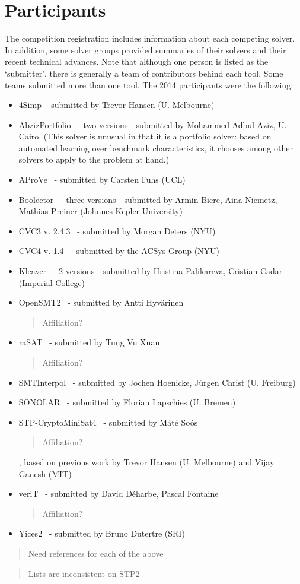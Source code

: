 \documentclass[twosize,11pt]{article}
\newcommand{\comment}[2]{\begin{quote}\sc #1\marginpar{\textcolor{red}{$\ast^{\mbox{#2}}$}}\end{quote}}
\newcommand{\davidc}[1]{\comment{#1}{DC}}
\begin{document}
\section{Participants}
\label{sec:participants}

The competition registration includes information about each competing solver. In addition, some solver groups provided summaries of their solvers and their recent technical advances.
 Note that although one person is listed as the `submitter', there is generally a team of contributors behind each tool. Some teams submitted more than one tool. The 2014 participants were the following:
\begin{itemize}
\item 4Simp~\cite{TBD}- submitted by Trevor Hansen (U. Melbourne)
\item AbzizPortfolio~\cite{TBD} - two versions - submitted by Mohammed Adbul Aziz, U. Cairo. (This solver is unusual in that it is a portfolio solver: based on automated learning over benchmark characteristics, it chooses among other solvers to apply to the problem at hand.)
\item AProVe~\cite{AProVE2014} - submitted by Carsten Fuhs (UCL)
\item Boolector~\cite{TBD} - three versions - submitted by Armin Biere, Aina Niemetz, Mathias Preiner (Johnnes Kepler University)
\item CVC3 v. 2.4.3~\cite{BT07} - submitted by Morgan Deters (NYU)
\item CVC4 v. 1.4~\cite{BCD+11} - submitted by the ACSys Group (NYU)
\item Kleaver~\cite{TBD} - 2 versions - submitted by Hristina Palikareva, Cristian Cadar (Imperial College)
\item OpenSMT2~\cite{TBD} - submitted by Antti Hyv\"arinen \davidc{Affiliation?}
\item raSAT~\cite{TBD} - submitted by Tung Vu Xuan \davidc{Affiliation?}
\item SMTInterpol~\cite{DBLP:conf/spin/ChristHN12,DBLP:conf/spin/2012} - submitted by Jochen Hoenicke, J\"urgen Christ (U. Freiburg)
\item SONOLAR~\cite{TBD} - submitted by Florian Lapschies (U. Bremen)
\item STP-CryptoMiniSat4~\cite{DBLP:conf/cav/GaneshD07,DBLP:conf/cav/2007} - submitted by M\'at\'e So\'os \davidc{Affiliation?}, based on previous work by Trevor Hansen (U. Melbourne) and Vijay Ganesh (MIT)
\item veriT~\cite{TBD} - submitted by David D\'{e}harbe, Pascal Fontaine \davidc{Affiliation?}
\item Yices2~\cite{Dutertre:cav2014} - submitted by Bruno Dutertre (SRI)
\end{itemize}
\davidc{Need references for each of the above}
\davidc{Lists are inconsistent on STP2}
\end{document}
